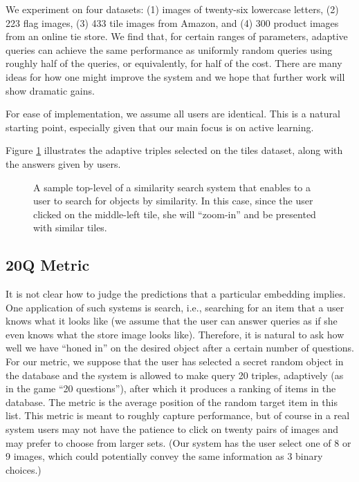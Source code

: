 \documentclass{article}
\begin{document}
We experiment on four datasets: (1) images of twenty-six lowercase letters, (2) 223 flag images, (3) 433 tile images from Amazon, and (4) 300 product images from an online tie store.  We find that, for certain ranges of parameters, adaptive queries can achieve the same performance as uniformly random queries using roughly half of the queries, or equivalently, for half of the cost.  There are many ideas for how one might improve the system and we hope that further work will show dramatic gains.

For ease of implementation, we assume all users are identical.  This is a natural starting point, especially given that our main focus is on active learning.

Figure \ref{fig:adaptive-trips} illustrates the adaptive triples selected on the tiles dataset, along with the answers given by users.
\begin{figure}
 \caption{\label{fig:adaptive-trips} A sample top-level of a similarity search system that enables to a user to search for objects by similarity.  In this case, since the user clicked on the middle-left tile, she will ``zoom-in'' and be presented with similar tiles.}
\end{figure}


\subsection{20Q Metric}
It is not clear how to judge the predictions that a particular embedding implies.  One application of such systems is search, i.e., searching for an item that a user knows what it looks like (we assume that the user can answer queries as if she even knows what the store image looks like).  Therefore, it is natural to ask how well we have ``honed in'' on the desired object after a certain number of questions.  For our metric, we suppose that the user has selected a secret random object in the database and the system is allowed to make query 20 triples, adaptively (as in the game ``20 questions''), after which it produces a ranking of items in the database.  The metric is the average position of the random target item in this list.  This metric is meant to roughly capture performance, but of course in a real system users may not have the patience to click on twenty pairs of images and may prefer to choose from larger sets. (Our system has the user select one of 8 or 9 images, which could potentially convey the same information as 3 binary choices.)  
\end{document}
